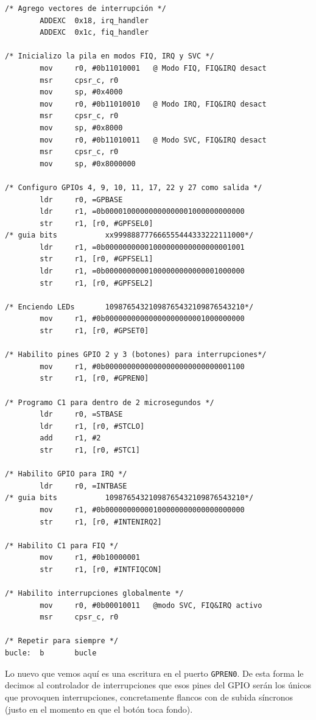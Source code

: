\begin{lstlisting}[caption={Programa principal de inter6.s},label={lst:codigoPract5_6}]
/* Agrego vectores de interrupción */
        ADDEXC  0x18, irq_handler
        ADDEXC  0x1c, fiq_handler

/* Inicializo la pila en modos FIQ, IRQ y SVC */
        mov     r0, #0b11010001   @ Modo FIQ, FIQ&IRQ desact
        msr     cpsr_c, r0
        mov     sp, #0x4000
        mov     r0, #0b11010010   @ Modo IRQ, FIQ&IRQ desact
        msr     cpsr_c, r0
        mov     sp, #0x8000
        mov     r0, #0b11010011   @ Modo SVC, FIQ&IRQ desact
        msr     cpsr_c, r0
        mov     sp, #0x8000000

/* Configuro GPIOs 4, 9, 10, 11, 17, 22 y 27 como salida */
        ldr     r0, =GPBASE
        ldr     r1, =0b00001000000000000001000000000000
        str     r1, [r0, #GPFSEL0]
/* guia bits           xx999888777666555444333222111000*/
        ldr     r1, =0b00000000001000000000000000001001
        str     r1, [r0, #GPFSEL1]
        ldr     r1, =0b00000000001000000000000001000000
        str     r1, [r0, #GPFSEL2]

/* Enciendo LEDs       10987654321098765432109876543210*/
        mov     r1, #0b00000000000000000000001000000000
        str     r1, [r0, #GPSET0]

/* Habilito pines GPIO 2 y 3 (botones) para interrupciones*/
        mov     r1, #0b00000000000000000000000000001100
        str     r1, [r0, #GPREN0]

/* Programo C1 para dentro de 2 microsegundos */
        ldr     r0, =STBASE
        ldr     r1, [r0, #STCLO]
        add     r1, #2
        str     r1, [r0, #STC1]

/* Habilito GPIO para IRQ */
        ldr     r0, =INTBASE
/* guia bits           10987654321098765432109876543210*/
        mov     r1, #0b00000000000100000000000000000000
        str     r1, [r0, #INTENIRQ2]

/* Habilito C1 para FIQ */
        mov     r1, #0b10000001
        str     r1, [r0, #INTFIQCON]

/* Habilito interrupciones globalmente */
        mov     r0, #0b00010011   @modo SVC, FIQ&IRQ activo
        msr     cpsr_c, r0

/* Repetir para siempre */
bucle:  b       bucle
\end{lstlisting}

Lo nuevo que vemos aquí es una escritura en el puerto {\tt GPREN0}. De esta forma
le decimos al controlador de interrupciones que esos pines del GPIO serán los únicos que
provoquen interrupciones, concretamente flancos con de subida síncronos (justo
en el momento en que el botón toca fondo).

